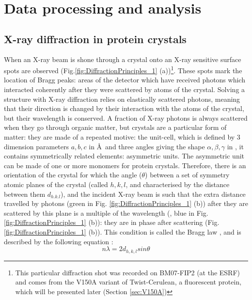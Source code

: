 \section{Data processing and analysis}\label{sec:dataprocan} %

\subsection{X-ray diffraction in protein crystals}
When an X-ray beam is shone through a crystal onto an X-ray sensitive surface spots are observed (Fig.\ref{fig:DiffractionPrinciples_1} (a))\footnote{This particular diffraction shot was recorded on BM07-FIP2 (at the ESRF) and comes from the V150A variant of Twist-Cerulean, a fluorescent protein, which will be presented later (Section \ref{sec:V150A})}. These spots mark the location of Bragg peaks: areas of the detector which have received photons which interacted coherently after they were scattered by atoms of the crystal. Solving a structure with X-ray diffraction relies on elastically scattered photons, meaning that their direction is changed by their interaction with the atoms of the crystal, but their wavelength is conserved. A fraction of X-ray photons is always scattered when they go through organic matter, but crystals are a particular form of matter: they are made of a repeated motive: the unit-cell, which is defined by 3 dimension parameters \(a, b, c\) in \AA\ and three angles giving the shape \(\alpha, \beta, \gamma\) in \degree, it contains symmetrically related elements: asymmetric units. The asymmetric unit can be made of one or more monomers for protein crystals. Therefore, there is an orientation of the crystal for which the angle (\(\theta\)) between a set of symmetry atomic planes of the crystal (called \(h,k,l\), and characterised by the distance between them \(d_{h.k.l}\)), and the incident X-ray beam is such that the extra distance travelled by photons (green in Fig. \ref{fig:DiffractionPrinciples_1} (b)) after they are scattered by this plane is a multiple of the wavelength (\textlambda, blue in Fig. \ref{fig:DiffractionPrinciples_1} (b)): they are in phase after scattering (Fig. \ref{fig:DiffractionPrinciples_1} (b)). This condition is called the Bragg law \parencite{drenthPrinciplesProteinXray1999}, and is described by the following equation : 
\begin{equation}\label{eq:bragglaw}
    n\lambda=2d_{h,k,l}sin\theta
\end{equation}
